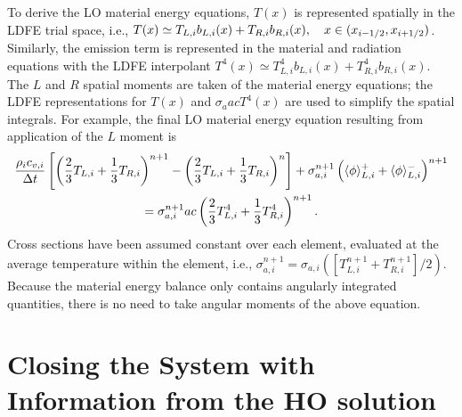 To derive the LO material energy equations, $T(x)$ is represented spatially in
the LDFE trial space, i.e.,
$ T(x) \simeq T_{L,i} b_{L,i}(x) + T_{R,i} b_{R,i}(x),\quad x\in(x_{i-1/2},x_{{i+1/2}})$.
Similarly, the emission term is represented in the material and radiation equations with the LDFE
interpolant $T^4(x)\simeq T_{L,i}^4 b_{L,i}(x) + T_{R,i}^4 b_{R,i}(x)$.   The $L$ and $R$ spatial moments are taken of the material
energy equations; the LDFE representations for $T(x)$ and $\sigma_a a c T^4(x)$ are used to
simplify the spatial integrals. For example, the final LO material energy
 equation resulting from application of the $L$ moment is
 \begin{multline}\label{lo_mat_dis}
     \frac{\rho_i c_{v,i}}{\Delta t}\left[ \left(\frac{2}{3}T_{L,i} + \frac{1}{3}T_{R,i}
        \right)^{n+1} - \left(\frac{2}{3}T_{L,i} + \frac{1}{3}T_{R,i}
    \right)^{n} \right]  + \sigma_{a,i}^{n+1} \left( \langle \phi \rangle_{L,i}^+ +
    \langle \phi \rangle_{L,i}^- \right)^{n+1} \\ = \sigma_{a,i}^{n+1}a c
\left( \frac{2}{3} T_{L,i}^4 + \frac{1}{3}T_{R,i}^4
        \right)^{n+1}.
\end{multline}
Cross sections have been assumed constant over each element, evaluated at the
average temperature within the element, i.e., $\sigma_{a,i}^{n+1} =
\sigma_{a,i}([T^{n+1}_{L,i}+T^{n+1}_{R,i}]/2)$.
Because the material energy balance
 only contains angularly integrated quantities, there is no need to take angular
 moments of the above equation.  

\section{Closing the System with Information from the HO solution}
\label{sec:closure}


